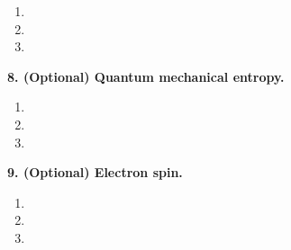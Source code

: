 \documentclass{article}
\theoremstyle{definition}
\begin{document}
\begin{enumerate}[label=(\alph*)]
	\item 
	\item 
	\item 
\end{enumerate}

\noindent \textbf{8. (Optional) Quantum mechanical entropy.}

\begin{enumerate}[label=(\alph*)]
	\item 
	\item 
	\item 
\end{enumerate}

\noindent \textbf{9. (Optional) Electron spin. }

\begin{enumerate}[label=(\alph*)]
	\item 
	\item 
	\item 
\end{enumerate}
\end{document}
